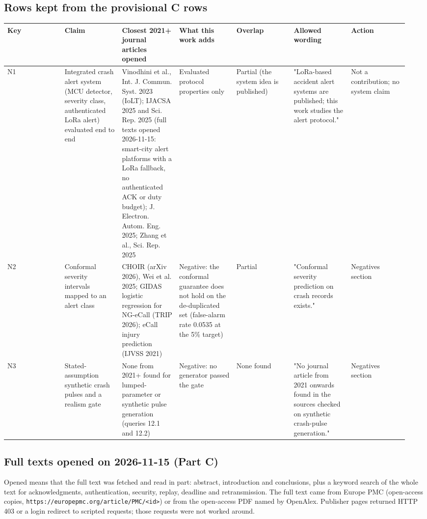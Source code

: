 \subsection*{Rows kept from the provisional C rows}

{\scriptsize\raggedright
\begin{longtable}{p{0.136\linewidth}p{0.136\linewidth}p{0.136\linewidth}p{0.136\linewidth}p{0.136\linewidth}p{0.136\linewidth}p{0.136\linewidth}}
\toprule
Key & Claim & Closest 2021+ journal articles opened & What this work adds & Overlap & Allowed wording & Action \\
\midrule
\endhead
N1 & Integrated crash alert system (MCU detector, severity class, authenticated LoRa alert) evaluated end to end & Vinodhini et al., Int. J. Commun. Syst. 2023 (IoLT); IJACSA 2025 and Sci. Rep. 2025 (full texts opened 2026-11-15: smart-city alert platforms with a LoRa fallback, no authenticated ACK or duty budget); J. Electron. Autom. Eng. 2025; Zhang et al., Sci. Rep. 2025 & Evaluated protocol properties only & Partial (the system idea is published) & "LoRa-based accident alert systems are published; this work studies the alert protocol." & Not a contribution; no system claim \\
N2 & Conformal severity intervals mapped to an alert class & CHOIR (arXiv 2026), Wei et al. 2025; GIDAS logistic regression for NG-eCall (TRIP 2026); eCall injury prediction (IJVSS 2021) & Negative: the conformal guarantee does not hold on the de-duplicated set (false-alarm rate 0.0535 at the 5\% target) & Partial & "Conformal severity prediction on crash records exists." & Negatives section \\
N3 & Stated-assumption synthetic crash pulses and a realism gate & None from 2021+ found for lumped-parameter or synthetic pulse generation (queries 12.1 and 12.2) & Negative: no generator passed the gate & None found & "No journal article from 2021 onwards found in the sources checked on synthetic crash-pulse generation." & Negatives section \\
\bottomrule
\end{longtable}}

\subsection*{Full texts opened on 2026-11-15 (Part C)}

Opened means that the full text was fetched and read in part: abstract, introduction and conclusions, plus a keyword search of the whole text for acknowledgments, authentication, security, replay, deadline and retransmission. The full text came from Europe PMC (open-access copies, \texttt{https://europepmc.org/article/PMC/<id>}) or from the open-access PDF named by OpenAlex. Publisher pages returned HTTP 403 or a login redirect to scripted requests; those requests were not worked around.

